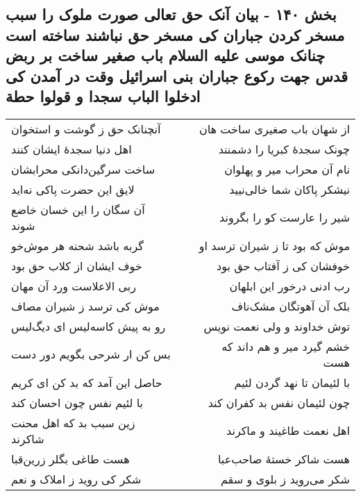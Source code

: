 \begin{center}
\section*{بخش ۱۴۰ - بیان آنک حق تعالی صورت ملوک را سبب مسخر کردن جباران کی مسخر حق نباشند ساخته است چنانک موسی علیه السلام باب صغیر ساخت بر ربض قدس جهت رکوع جباران بنی اسرائیل وقت در آمدن کی ادخلوا الباب سجدا و قولوا حطة}
\label{sec:sh140}
\begin{longtable}{l p{0.5cm} r}
آنچنانک حق ز گوشت و استخوان
&&
از شهان باب صغیری ساخت هان
\\
اهل دنیا سجدهٔ ایشان کنند
&&
چونک سجدهٔ کبریا را دشمنند
\\
ساخت سرگین‌دانکی محرابشان
&&
نام آن محراب میر و پهلوان
\\
لایق این حضرت پاکی نه‌اید
&&
نیشکر پاکان شما خالی‌نیید
\\
آن سگان را این خسان خاضع شوند
&&
شیر را عارست کو را بگروند
\\
گربه باشد شحنه هر موش‌خو
&&
موش که بود تا ز شیران ترسد او
\\
خوف ایشان از کلاب حق بود
&&
خوفشان کی ز آفتاب حق بود
\\
ربی الاعلاست ورد آن مهان
&&
رب ادنی درخور این ابلهان
\\
موش کی ترسد ز شیران مصاف
&&
بلک آن آهوتگان مشک‌ناف
\\
رو به پیش کاسه‌لیس ای دیگ‌لیس
&&
توش خداوند و ولی نعمت نویس
\\
بس کن ار شرحی بگویم دور دست
&&
خشم گیرد میر و هم داند که هست
\\
حاصل این آمد که بد کن ای کریم
&&
با لئیمان تا نهد گردن لئیم
\\
با لئیم نفس چون احسان کند
&&
چون لئیمان نفس بد کفران کند
\\
زین سبب بد که اهل محنت شاکرند
&&
اهل نعمت طاغیند و ماکرند
\\
هست طاغی بگلر زرین‌قبا
&&
هست شاکر خستهٔ صاحب‌عبا
\\
شکر کی روید ز املاک و نعم
&&
شکر می‌روید ز بلوی و سقم
\\
\end{longtable}
\end{center}
